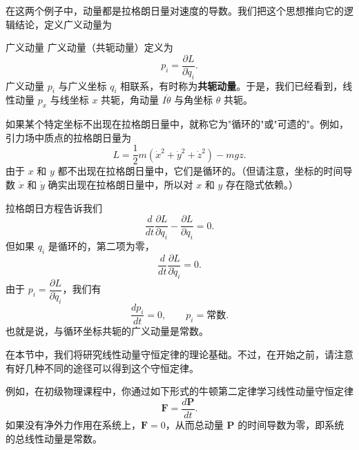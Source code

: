 在这两个例子中，动量都是拉格朗日量对速度的导数。我们把这个思想推向它的逻辑结论，定义广义动量为
\begin{mydefinition}{广义动量}
广义动量（共轭动量）定义为
\begin{equation}\label{eq:1.p}
p_i = \frac{\partial L}{\partial \dot{q}_i}.
\end{equation}
广义动量 $p_i$ 与广义坐标 $q_i$ 相联系，有时称为\textbf{共轭动量}。于是，我们已经看到，线性动量 $p_x$ 与线坐标 $x$ 共轭，角动量 $I\dot{\theta}$ 与角坐标 $\theta$ 共轭。
\end{mydefinition}

如果某个特定坐标不出现在拉格朗日量中，就称它为"循环的"或"可遗的"。例如，引力场中质点的拉格朗日量为
\begin{equation}\label{eq:1.Lgrav}
L = \frac{1}{2}m(\dot{x}^2 + \dot{y}^2 + \dot{z}^2) - mgz.
\end{equation}
由于 $x$ 和 $y$ 都不出现在拉格朗日量中，它们是循环的。（但请注意，坐标的时间导数 $\dot{x}$ 和 $\dot{y}$ 确实出现在拉格朗日量中，所以对 $x$ 和 $y$ 存在隐式依赖。）

拉格朗日方程告诉我们
\begin{equation*}
\frac{d}{dt}\frac{\partial L}{\partial \dot{q}_i} - \frac{\partial L}{\partial q_i} = 0.
\end{equation*}
但如果 $q_i$ 是循环的，第二项为零，
\begin{equation*}
\frac{d}{dt}\frac{\partial L}{\partial \dot{q}_i} = 0.
\end{equation*}
由于 $p_i = \dfrac{\partial L}{\partial \dot{q}_i}$，我们有
\begin{equation}\label{eq:1.cyc}
\frac{dp_i}{dt} = 0, \qquad p_i = \text{常数}.
\end{equation}
也就是说，与循环坐标共轭的广义动量是常数。

在本节中，我们将研究线性动量守恒定律的理论基础。不过，在开始之前，请注意有好几种不同的途径可以得到这个守恒定律。

例如，在初级物理课程中，你通过如下形式的牛顿第二定律学习线性动量守恒定律
\begin{equation}\label{eq:1.momN}
\mathbf{F} = \frac{d\mathbf{P}}{dt}.
\end{equation}
如果没有净外力作用在系统上，$\mathbf{F} = 0$，从而总动量 $\mathbf{P}$ 的时间导数为零，即系统的总线性动量是常数。

